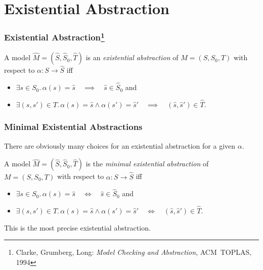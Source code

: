
\section{Existential Abstraction}

\begin{frame}
\frametitle{Existential
Abstraction\footnote{Clarke, Grumberg, Long: {\it Model Checking and Abstraction},
ACM~TOPLAS, 1994}}

\begin{definition}
A model $\hat M=( \hat S, \hat S_0, \hat T)$ is an
\emph{\alert{existential abstraction}} of $M=( S, S_0, T)$ with
respect to $\alpha: S \rightarrow \hat S$ iff
%
\begin{itemize}
\item $\exists s \in S_0.\, \alpha(s)=\hat s \quad \implies\quad \hat s \in \hat
S_0$ \quad and
\item $\exists (s,s') \in T.\, \alpha(s)=\hat s \land \alpha(s')=\hat s'
\quad\implies\quad (\hat s, \hat s') \in \hat T$.
\end{itemize}
\end{definition}

\end{frame}


\begin{frame}
\frametitle{Minimal Existential Abstractions}

There are obviously many choices for an existential abstraction
for a given $\alpha$.
\vfill

\begin{definition}
A model $\hat M=( \hat S, \hat S_0, \hat T)$ is the
\emph{\alert{minimal existential abstraction}} of $M=( S, S_0, T)$ with
respect to $\alpha: S \rightarrow \hat S$ iff
%
\begin{itemize}
\item $\exists s \in S_0.\, \alpha(s)=\hat s \quad \iff \quad \hat s \in \hat
S_0$ \quad and
\item $\exists (s,s') \in T.\, \alpha(s)=\hat s \land \alpha(s')=\hat s'
\quad\iff \quad (\hat s, \hat s') \in \hat T$.
\end{itemize}
\end{definition}
\vfill

This is the most precise existential abstraction.

\end{frame}

